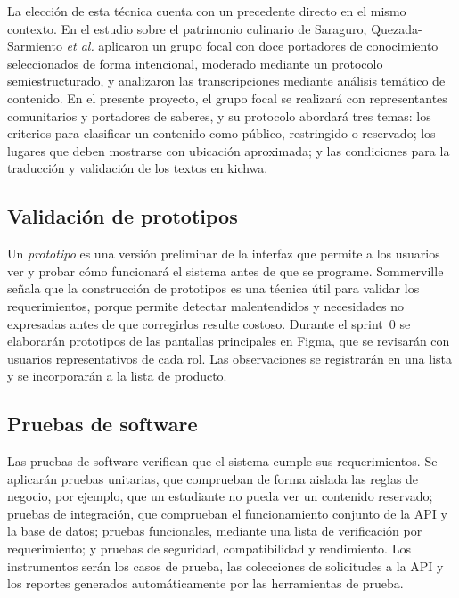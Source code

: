 La elección de esta técnica cuenta con un precedente directo en el mismo contexto. En el estudio sobre el patrimonio culinario de Saraguro, Quezada-Sarmiento \textit{et al.} \cite{quezada2026culinary} aplicaron un grupo focal con doce portadores de conocimiento seleccionados de forma intencional, moderado mediante un protocolo semiestructurado, y analizaron las transcripciones mediante análisis temático de contenido. En el presente proyecto, el grupo focal se realizará con representantes comunitarios y portadores de saberes, y su protocolo abordará tres temas: los criterios para clasificar un contenido como público, restringido o reservado; los lugares que deben mostrarse con ubicación aproximada; y las condiciones para la traducción y validación de los textos en kichwa.

\subsection{Validación de prototipos}
Un \textit{prototipo} es una versión preliminar de la interfaz que permite a los usuarios ver y probar cómo funcionará el sistema antes de que se programe. Sommerville \cite{sommerville2016software} señala que la construcción de prototipos es una técnica útil para validar los requerimientos, porque permite detectar malentendidos y necesidades no expresadas antes de que corregirlos resulte costoso. Durante el sprint~0 se elaborarán prototipos de las pantallas principales en Figma, que se revisarán con usuarios representativos de cada rol. Las observaciones se registrarán en una lista y se incorporarán a la lista de producto.

\subsection{Pruebas de software}
Las pruebas de software verifican que el sistema cumple sus requerimientos. Se aplicarán pruebas unitarias, que comprueban de forma aislada las reglas de negocio, por ejemplo, que un estudiante no pueda ver un contenido reservado; pruebas de integración, que comprueban el funcionamiento conjunto de la API y la base de datos; pruebas funcionales, mediante una lista de verificación por requerimiento; y pruebas de seguridad, compatibilidad y rendimiento. Los instrumentos serán los casos de prueba, las colecciones de solicitudes a la API y los reportes generados automáticamente por las herramientas de prueba.

